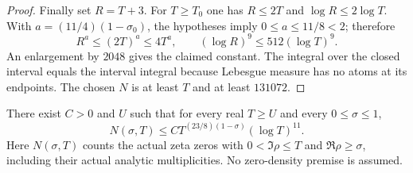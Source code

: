\begin{proof}
Finally set $R=T+3$.
For $T\ge T_0$ one has $R\le2T$ and
$\log R\le2\log T$.
With $a=(11/4)(1-\sigma_0)$, the hypotheses imply $0\le a\le11/8<2$;
therefore
\[
 R^a\le(2T)^a\le4T^a,\qquad
 (\log R)^9\le512(\log T)^9.
\]
An enlargement by $2048$ gives the claimed constant.
The integral over the closed interval equals the interval integral
because Lebesgue measure has no atoms at its endpoints.
The chosen $N$ is at least $T$ and at least $131072$.
\end{proof}

\begin{theorem}
\label{density:uniform-zeta}
\leanok
There exist $C>0$ and $U$ such that for every real $T\ge U$ and
every $0\le\sigma\le1$,
\[
 N(\sigma,T)\le C T^{(23/8)(1-\sigma)}(\log T)^{11}.
\]
Here $N(\sigma,T)$ counts the actual zeta zeros with
$0<\Im\rho\le T$ and $\Re\rho\ge\sigma$, including their actual
analytic multiplicities.  No zero-density premise is assumed.
\end{theorem}
